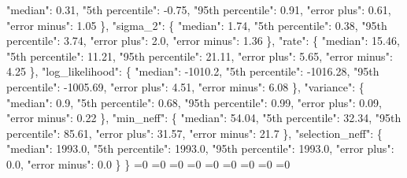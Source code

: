 {{        "median": 0.31, %
        "5th percentile": {-}0.75, %
        "95th percentile": 0.91, %
        "error plus": 0.61, %
        "error minus": 1.05%
      \}, %
      "sigma\_2": \{%
        "median": 1.74, %
        "5th percentile": 0.38, %
        "95th percentile": 3.74, %
        "error plus": 2.0, %
        "error minus": 1.36%
      \}, %
      "rate": \{%
        "median": 15.46, %
        "5th percentile": 11.21, %
        "95th percentile": 21.11, %
        "error plus": 5.65, %
        "error minus": 4.25%
      \}, %
      "log\_likelihood": \{%
        "median": {-}1010.2, %
        "5th percentile": {-}1016.28, %
        "95th percentile": {-}1005.69, %
        "error plus": 4.51, %
        "error minus": 6.08%
      \}, %
      "variance": \{%
        "median": 0.9, %
        "5th percentile": 0.68, %
        "95th percentile": 0.99, %
        "error plus": 0.09, %
        "error minus": 0.22%
      \}, %
      "min\_neff": \{%
        "median": 54.04, %
        "5th percentile": 32.34, %
        "95th percentile": 85.61, %
        "error plus": 31.57, %
        "error minus": 21.7%
      \}, %
      "selection\_neff": \{%
        "median": 1993.0, %
        "5th percentile": 1993.0, %
        "95th percentile": 1993.0, %
        "error plus": 0.0, %
        "error minus": 0.0%
      \}%
    \}}%
  \else%
    \ifnum{}=0%
      \let\MagTruncnormIndTiltIsotropicTruncnormNnd@I@out\MagTruncnormIndTiltIsotropicTruncnormNnd@III%
    \else%
      \ifnum{}=0%
      \let\MagTruncnormIndTiltIsotropicTruncnormNnd@I@out\MagTruncnormIndTiltIsotropicTruncnormNnd@IV%
    \else%
      \ifnum{}=0%
      \let\MagTruncnormIndTiltIsotropicTruncnormNnd@I@out\MagTruncnormIndTiltIsotropicTruncnormNnd@V%
    \else%
      \ifnum{}=0%
      \let\MagTruncnormIndTiltIsotropicTruncnormNnd@I@out\MagTruncnormIndTiltIsotropicTruncnormNnd@VI%
    \else%
      \ifnum{}=0%
      \let\MagTruncnormIndTiltIsotropicTruncnormNnd@I@out\MagTruncnormIndTiltIsotropicTruncnormNnd@VII%
    \else%
      \ifnum{}=0%
      \let\MagTruncnormIndTiltIsotropicTruncnormNnd@I@out\MagTruncnormIndTiltIsotropicTruncnormNnd@VIII%
    \else%
      \ifnum{}=0%
      \let\MagTruncnormIndTiltIsotropicTruncnormNnd@I@out\MagTruncnormIndTiltIsotropicTruncnormNnd@IX%
    \else%
      \ifnum{}=0%
      \let\MagTruncnormIndTiltIsotropicTruncnormNnd@I@out\MagTruncnormIndTiltIsotropicTruncnormNnd@X%
    \else%
      \ifnum{}=0%
}
